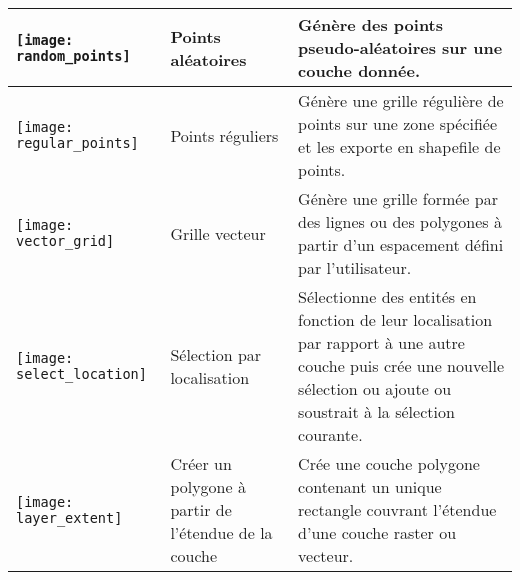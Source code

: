 \begin{table}[ht]
\begin{tabular}{|p{0.3in}|p{1.3in}|p{4.6in}|}
 \hline \texttt{[image: random\_points]} & Points aléatoires & Génère des points pseudo-aléatoires sur une couche donnée. \\
 \hline \texttt{[image: regular\_points]} & Points réguliers & Génère une grille régulière de points sur une zone spécifiée et les exporte en shapefile de points. \\
 \hline \texttt{[image: vector\_grid]} & Grille vecteur & Génère une grille formée par des lignes ou des polygones à partir d'un espacement défini par l'utilisateur. \\
 \hline \texttt{[image: select\_location]} & Sélection par localisation & Sélectionne des entités en fonction de leur localisation par rapport à une autre couche puis crée une nouvelle sélection ou ajoute ou soustrait à la sélection courante. \\
\hline \texttt{[image: layer\_extent]} & Créer un polygone à partir de l'étendue de la couche & Crée une couche polygone contenant un unique rectangle couvrant l'étendue d'une couche raster ou vecteur. \\
 \hline
\end{tabular}
\end{table}

